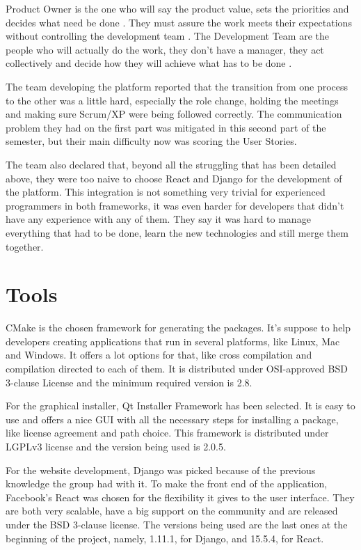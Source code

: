 Product Owner is the one who will say the product value, sets the priorities and decides what need be done \cite{agile422017}. They must assure the work meets their expectations without controlling the development team \cite{scrumalliance2017}. The Development Team are the people who will actually do the work, they don't have a manager, they act collectively and decide how they will achieve what has to be done \cite{scrumalliance2017}.

The team developing the platform reported that the transition from one process to the other was a little hard, especially the role change, holding the meetings and making sure Scrum/XP were being followed correctly. The communication problem they had on the first part was mitigated in this second part of the semester, but their main difficulty now was scoring the User Stories.

The team also declared that, beyond all the struggling that has been detailed above, they were too naive to choose React and Django for the development of the platform. This integration is not something very trivial for experienced programmers in both frameworks, it was even harder for developers that didn't have any experience with any of them. They say it was hard to manage everything that had to be done, learn the new technologies and still merge them together.

\section{Tools}
\label{sec:tools}

CMake is the chosen framework for generating the packages. It's suppose to help developers creating applications that run in several platforms, like Linux, Mac and Windows. It offers a lot options for that, like cross compilation and compilation directed to each of them. It is distributed under OSI-approved BSD 3-clause License and the minimum required version is 2.8.

For the graphical installer, Qt Installer Framework has been selected. It is easy to use and offers a nice GUI with all the necessary steps for installing a package, like license agreement and path choice. This framework is distributed under LGPLv3 license and the version being used is 2.0.5.

For the website development, Django was picked because of the previous knowledge the group had with it. To make the front end of the application, Facebook's React was chosen for the flexibility it gives to the user interface. They are both very scalable, have a big support on the community and are released under the BSD 3-clause license. The versions being used are the last ones at the beginning of the project, namely, 1.11.1, for Django, and 15.5.4, for React.

